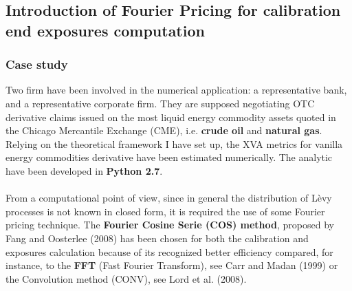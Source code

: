 \documentclass{beamer}
\begin{document}
\subsection{Introduction of Fourier Pricing for calibration end exposures computation}

\begin{frame}
	\frametitle{Case study}
	
	Two firm have been involved in the numerical application: a representative bank, and a representative corporate firm. They are supposed negotiating OTC derivative claims issued on the most liquid energy commodity assets quoted in the Chicago Mercantile Exchange (CME), i.e. \textbf{crude oil} and \textbf{natural gas}. 
	Relying on the theoretical framework I have set up, the XVA metrics for vanilla energy commodities derivative have been estimated numerically. The analytic have been developed in \textbf{Python 2.7}. \\~\\


	From a computational point of view, since in general the distribution of Lèvy processes is not known in closed form, it is required the use of some Fourier pricing technique. The \textbf{Fourier Cosine Serie (COS) method}, proposed by Fang and Oosterlee (2008) has been chosen for both the calibration and exposures calculation because of its recognized better efficiency compared, for instance, to the \textbf{FFT} (Fast Fourier Transform), see Carr and Madan (1999) or the Convolution method (CONV), see Lord et al. (2008).
\end{frame}

%
%
%
%	
%	
\end{document}
